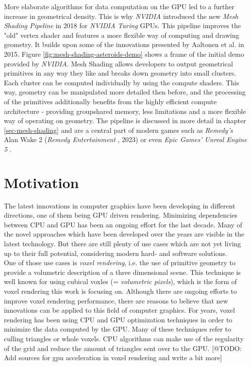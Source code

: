 \noindent
More elaborate algorithms for data computation on the \ac{GPU} led to a further increase in geometrical density.
This is why \emph{NVIDIA} introduced the new \emph{Mesh Shading Pipeline} in 2018 for \emph{NVIDIA Turing} \ac{GPU}s.
This pipeline improves the "old" vertex shader and features a more flexible way of computing and drawing geometry. 
It builds upon some of the innovations presented by Aaltonen et al.  \cite{Aaltonen2015} in 2015. Figure 
\ref{fig:mesh-shading-asteroids-demo} shows a frame of the initial demo provided by \emph{NVIDIA}. Mesh Shading 
allows developers to output geometrical primitives in any way they like and breaks down geometry into small clusters.
Each cluster can be computed individually by using the compute shaders. This way, geometry can be manipulated more 
detailed then before, and the processing of the primitives additionally benefits from the highly efficient compute 
architecture - providing groupshared memory, less limitations and a more flexible way of operating on geometry.
The pipeline is discussed in more detail in chapter \ref{sec-mesh-shading} and are a central part of modern games 
such as \emph{Remedy's} Alan Wake 2 (\emph{Remedy Entertainment} \cite{AlanWake22023}, 2023) or even 
\emph{Epic Games'} \emph{Unreal Engine 5} \cite{Karis2021}. 


\section{Motivation} \label{sec-motivation}

The latest innovations in computer graphics have been developing in different directions,
one of them being \ac{GPU} driven rendering. Minimizing dependencies between \ac{CPU} and \ac{GPU} 
has been an ongoing effort for the last decade. Many of the novel approaches which have been developed 
over the years are visible in the latest technology. But there are still plenty of use cases which are 
not yet living up to their full potential, considering modern hard- and software solutions.\\

\noindent 
One of those use cases is \emph{voxel rendering}, i.e. the use of primitive geometry to provide a 
volumetric description of a three dimensional scene. This technique is well known for using 
cubical voxles (= \emph{volumetric pixels}), which is the form of voxel rendering this work is 
focusing on. Although there are ongoing efforts to improve voxel rendering performance, there are 
reasons to believe that new innovations can be applied to this field of computer graphics. For years, 
voxel rendering has been using \ac{CPU} and \ac{GPU} optimization techniques in order to minimize 
the data computed by the \ac{GPU}. Many of these techniques refer to culling triangles or whole voxels. 
\ac{CPU} algorithms can make use of the regularity of the grid and reduce the amount of triangles sent 
over to the \ac{GPU}. [@TODO: Add sources for gpu acceleration in voxel rendering and write a bit more] \\

